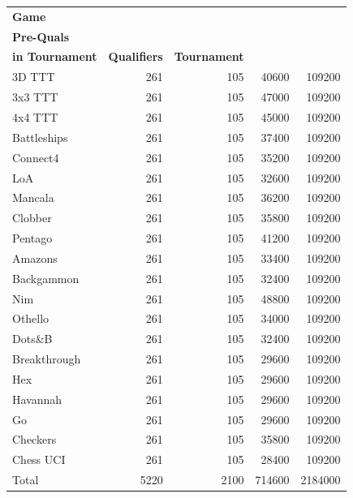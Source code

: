 \begin{tabular}{lrrrr}
\toprule
\textbf{Game} &
\makecell{\textbf{\# Automata}\\\textbf{Pre-Quals}} &
\makecell{\textbf{\# Automata}\\\textbf{in Tournament}} &
\textbf{Qualifiers} &
\textbf{Tournament} \\
\midrule
3D TTT & 261 & 105 & 40600 & 109200 \\
3x3 TTT & 261 & 105 & 47000 & 109200 \\
4x4 TTT & 261 & 105 & 45000 & 109200 \\
Battleships & 261 & 105 & 37400 & 109200 \\
Connect4 & 261 & 105 & 35200 & 109200 \\
LoA & 261 & 105 & 32600 & 109200 \\
Mancala & 261 & 105 & 36200 & 109200 \\
Clobber & 261 & 105 & 35800 & 109200 \\
Pentago & 261 & 105 & 41200 & 109200 \\
Amazons & 261 & 105 & 33400 & 109200 \\
Backgammon & 261 & 105 & 32400 & 109200 \\
Nim & 261 & 105 & 48800 & 109200 \\
Othello & 261 & 105 & 34000 & 109200 \\
Dots\&B & 261 & 105 & 32400 & 109200 \\
Breakthrough & 261 & 105 & 29600 & 109200 \\
Hex & 261 & 105 & 29600 & 109200 \\
Havannah & 261 & 105 & 29600 & 109200 \\
Go & 261 & 105 & 29600 & 109200 \\
Checkers & 261 & 105 & 35800 & 109200 \\
Chess UCI & 261 & 105 & 28400 & 109200 \\
\midrule
Total & 5220 & 2100 & 714600 & 2184000 \\
\bottomrule
\end{tabular}
